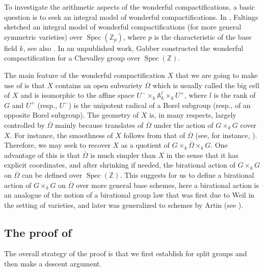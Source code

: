 \documentclass[11pt, reqno]{amsart}
\theoremstyle{plain}
\theoremstyle{definition}
\DeclareMathOperator{\Spec}{Spec}		%
\begin{document}
To investigate the arithmetic aspects of the wonderful compactifications, a basic question is to seek an integral model of wonderful compactifications. In \cite{Faltingsresolution}, Faltings sketched an integral model of wonderful compactifications (for more general symmetric varieties) over $\Spec (\mathbb{Z}_p)$, where $p$ is the characteristic of the base field $k$, see also \cite{SpringerConcinicompactification}. In an unpublished work, Gabber constructed the wonderful compactification for a Chevalley group over $\Spec(\mathbb{Z})$.

The main feature of the wonderful compactification $X$ that we are going to make use of is that $X$ contains an open subvariety $\overline{\Omega}$ which is usually called the big cell of $X$ and is isomorphic to the affine space $U^-\times_k \mathbb{A}^l_k\times_k U^+ $, where $l$ is the rank of $G$ and $U^+$ (resp., $U^-$) is the unipotent radical of a Borel subgroup (resp., of an opposite Borel subgroup). The geometry of $X$ is, in many respects, largely controlled by $\overline{\Omega}$ mainly because translates of $\overline{\Omega}$ under the action of $G\times_k G$ cover $X$. For instance, the smoothness of $X$ follows from that of $\overline{\Omega}$ (see, for instance, \cite[Theorem~6.1.8 (i)]{BrionKumar}). Therefore, we may seek to  recover $X$ as a quotient of $G\times_k\overline{\Omega}\times_k G$. One advantage of this is that $\overline{\Omega}$ is much simpler than $X$ in the sense that it has explicit coordinates, and after shrinking if needed, the birational action of $G\times_k G$ on $\overline{\Omega}$ can be defined over $\Spec(\mathbb{Z})$. This suggests for us to define a birational action of $ G\times_k  G$ on $\overline{\Omega}$ over more general base schemes, here a birational action is an analogue of the notion of a birational group law that was first due to Weil in the setting of  varieties, and later was generalized to schemes by Artin (see \cite{groupschemeoutofbirationallaw}).

\subsection{The proof of }
 The overall strategy of the proof is that we first establish  for split groups and then make a descent argument.
\end{document}
